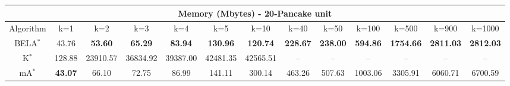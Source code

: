 \begin{tabular}{c|cccccccccccc}\toprule
\multicolumn{13}{c}{Memory (Mbytes) - 20-Pancake unit}\\ \midrule
Algorithm & k=1 & k=2 & k=3 & k=4 & k=5 & k=10 & k=40 & k=50 & k=100 & k=500 & k=900 & k=1000 \\ \midrule
BELA$^*$ & 43.76 & \textbf{53.60} & \textbf{65.29} & \textbf{83.94} & \textbf{130.96} & \textbf{120.74} & \textbf{228.67} & \textbf{238.00} & \textbf{594.86} & \textbf{1754.66} & \textbf{2811.03} & \textbf{2812.03} \\
K$^*$ & 128.88 & 23910.57 & 36834.92 & 39387.00 & 42481.35 & 42565.51 & -- & -- & -- & -- & -- & -- \\
mA$^*$ & \textbf{43.07} & 66.10 & 72.75 & 86.99 & 141.11 & 300.14 & 463.26 & 507.63 & 1003.06 & 3305.91 & 6060.71 & 6700.59 \\ \bottomrule 
\end{tabular}
